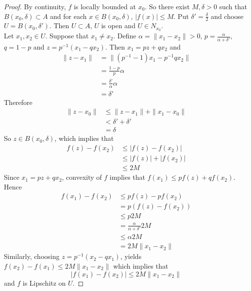 \documentclass[12pt]{amsart}
\theoremstyle{definition}
\theoremstyle{remark}
\theoremstyle{definition}
\newcommand{\al}{\alpha}
\newcommand{\del}{\delta}
\begin{document}
	\begin{proof}
	By continuity, $f$ is locally bounded at $x_0$. So there exist $M, \del >0$ such that $B(x_0, \del) \subset A$ and for each $x \in B(x_0, \del)$, $|f(x)| \leq M$. Put $\del' = \frac{\del}{2}$ and choose $U = B(x_0, \del')$. Then $U \subset A$, $U$ is open and $U \in N_{x_0}$. \\
	Let $x_1, x_2 \in U$. Suppose that $x_1 \neq x_2$. Define $\al = \|x_1 - x_2\| >0$, $p = \frac{\al}{\al + \del'}$, $q = 1-p$ and $z = p^{-1}(x_1 - qx_2)$. Then $x_1 = pz + qx_2$ and 
	\begin{align*}
	\|z - x_1\| 
	&= \|(p^{-1} - 1)x_1 - p^{-1}qx_2\| \\
	&= \frac{1-p}{p} \al \\
	&= \frac{\del'}{\al} \al \\
	&= \del ' 
	\end{align*}
	Therefore 
	\begin{align*}
	\|z - x_0\| 
	& \leq \|z - x_1\| + \|x_1 - x_0\| \\
	& <  \del '  + \del '  \\
	&= \del
\end{align*}	  
	So $z \in B(x_0, \del)$, which implies that 
	\begin{align*}
	f(z) - f(x_2) 
	& \leq |f(z) - f(x_2)|\\ 
	&\leq |f(z)| + |f(x_2)| \\
	&\leq 2M
\end{align*}		
	Since $x_1 = pz + qx_2$, convexity of $f$ implies that $f(x_1) \leq pf(z) + qf(x_2)$. Hence 
	\begin{align*}
	f(x_1) - f(x_2) 
	& \leq pf(z) -pf(x_2) \\
	&= p(f(z) - f(x_2)) \\
	& \leq p 2M \\
	&= \frac{\al}{\al + \del'} 2M \\
	& \leq \al 2M \\
	&= 2M \|x_1 - x_2 \|
	\end{align*}
	Similarly, choosing $z = p^{-1}(x_2 - qx_1)$, yields $f(x_2) - f(x_1) \leq 2M \|x_1 - x_2 \|$ which implies that $$|f(x_1) - f(x_2)| \leq 2M \|x_1 - x_2 \|$$ and $f$ is Lipschitz on $U$. 
 	\end{proof}



	
	
	
	
	
	
	
	
	
	
\end{document}
